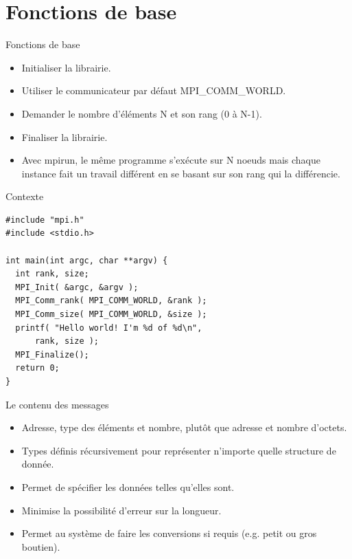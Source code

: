 \documentclass[10pt]{beamer}
\begin{document}
\section{Fonctions de base}

\begin{frame}{Fonctions de base}

  \begin{itemize}
    \item Initialiser la librairie.

    \item Utiliser le communicateur par défaut MPI\_COMM\_WORLD.

    \item Demander le nombre d'éléments N et son rang (0 à N-1).

    \item Finaliser la librairie.

    \item Avec mpirun, le même programme s'exécute sur N noeuds mais chaque instance fait un travail différent en se basant sur son rang qui la différencie.
  \end{itemize}
\end{frame}

\begin{frame}{Contexte}

  \begin{verbatim}
#include "mpi.h"
#include <stdio.h>

int main(int argc, char **argv) {
  int rank, size;
  MPI_Init( &argc, &argv );
  MPI_Comm_rank( MPI_COMM_WORLD, &rank );
  MPI_Comm_size( MPI_COMM_WORLD, &size );
  printf( "Hello world! I'm %d of %d\n",
      rank, size );
  MPI_Finalize();
  return 0;
}
  \end{verbatim}
\end{frame}

\begin{frame}{Le contenu des messages}

  \begin{itemize}
    \item Adresse, type des éléments et nombre, plutôt que adresse et nombre d'octets.

    \item Types définis récursivement pour représenter n'importe quelle structure de donnée.

    \item Permet de spécifier les données telles qu'elles sont.

    \item Minimise la possibilité d'erreur sur la longueur.

    \item Permet au système de faire les conversions si requis (e.g. petit ou gros boutien).
  \end{itemize}
\end{frame}
\end{document}
